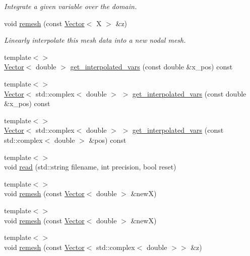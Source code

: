 \begin{DoxyCompactItemize}
\begin{DoxyCompactList}\small\item\em Integrate a given variable over the domain. \end{DoxyCompactList}\item 
void \hyperlink{classLuna_1_1Mesh1D_ac4df77e9ee7aeb4dbcf4dec8edd1a4c3}{remesh} (const \hyperlink{classLuna_1_1Vector}{Vector}$<$ X $>$ \&z)
\begin{DoxyCompactList}\small\item\em Linearly interpolate this mesh data into a new nodal mesh. \end{DoxyCompactList}\item 
{\footnotesize template$<$$>$ }\\\hyperlink{classLuna_1_1Vector}{Vector}$<$ double $>$ \hyperlink{classLuna_1_1Mesh1D_a0e248d3566778b329594a921398205f1}{get\+\_\+interpolated\+\_\+vars} (const double \&x\+\_\+pos) const
\item 
{\footnotesize template$<$$>$ }\\\hyperlink{classLuna_1_1Vector}{Vector}$<$ std\+::complex$<$ double $>$ $>$ \hyperlink{classLuna_1_1Mesh1D_a82ec81e6e39128431ad6dfa752456313}{get\+\_\+interpolated\+\_\+vars} (const double \&x\+\_\+pos) const
\item 
{\footnotesize template$<$$>$ }\\\hyperlink{classLuna_1_1Vector}{Vector}$<$ std\+::complex$<$ double $>$ $>$ \hyperlink{classLuna_1_1Mesh1D_a58f5f0a80fc4af9e82d5753f5b29604a}{get\+\_\+interpolated\+\_\+vars} (const std\+::complex$<$ double $>$ \&pos) const
\item 
{\footnotesize template$<$$>$ }\\void \hyperlink{classLuna_1_1Mesh1D_a44c64e8949c67fd0274634c6c0df0d3b}{read} (std\+::string filename, int precision, bool reset)
\item 
{\footnotesize template$<$$>$ }\\void \hyperlink{classLuna_1_1Mesh1D_a2648e36fd6dc8c769501a775347281b6}{remesh} (const \hyperlink{classLuna_1_1Vector}{Vector}$<$ double $>$ \&newX)
\item 
{\footnotesize template$<$$>$ }\\void \hyperlink{classLuna_1_1Mesh1D_a256e7318b0f42a43d2d9f803b452e625}{remesh} (const \hyperlink{classLuna_1_1Vector}{Vector}$<$ double $>$ \&newX)
\item 
{\footnotesize template$<$$>$ }\\void \hyperlink{classLuna_1_1Mesh1D_a0caa5cfc7ced1937c94e692c3bdbdc25}{remesh} (const \hyperlink{classLuna_1_1Vector}{Vector}$<$ std\+::complex$<$ double $>$$>$ \&z)
\end{DoxyCompactItemize}



